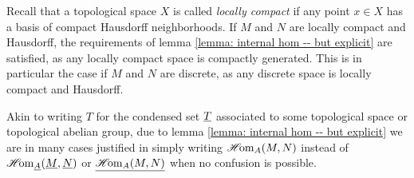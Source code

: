 \begin{remark}
	Recall that a topological space $X$ is called \emph{locally compact} if any point $x\in X$ has a basis of compact Hausdorff neighborhoods. If $M$ and $N$ are locally compact and Hausdorff, the requirements of lemma \ref{lemma: internal hom -- but explicit} are satisfied, as any locally compact space is compactly generated. This is in particular the case if $M$ and $N$ are discrete, as any discrete space is locally compact and Hausdorff.
\end{remark}

\begin{notation}
	Akin to writing $T$ for the condensed set $\underline{T}$ associated to some topological space or topological abelian group, due to lemma \ref{lemma: internal hom -- but explicit} we are in many cases justified in simply writing ${\operatorname{\mathscr{H}\!om}}_A(M, N)$ instead of ${\operatorname{\mathscr{H}\!om}}_{\underline{A}}(\underline{M}, \underline{N})$ or $\underline{{\operatorname{\mathscr{H}\!om}}_A(M, N)}$ when no confusion is possible.
\end{notation}



